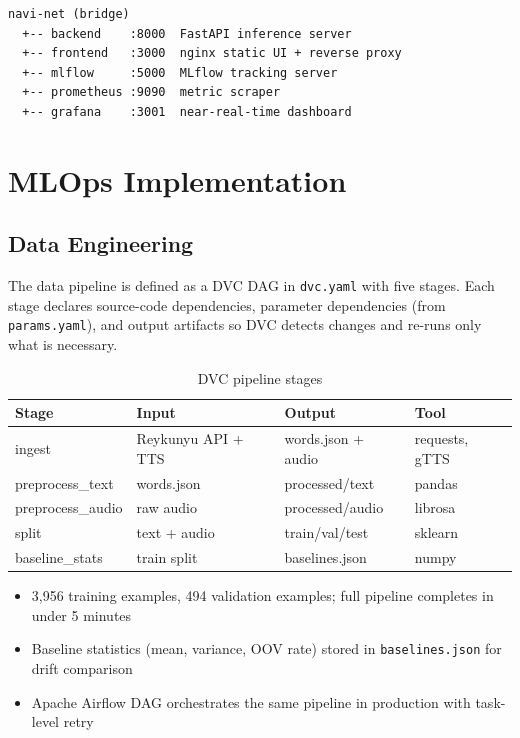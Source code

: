 \documentclass[12pt,a4paper]{article}
\begin{document}
\begin{lstlisting}
navi-net (bridge)
  +-- backend    :8000  FastAPI inference server
  +-- frontend   :3000  nginx static UI + reverse proxy
  +-- mlflow     :5000  MLflow tracking server
  +-- prometheus :9090  metric scraper
  +-- grafana    :3001  near-real-time dashboard
\end{lstlisting}

\section{MLOps Implementation}

\subsection{Data Engineering}

The data pipeline is defined as a DVC DAG in \texttt{dvc.yaml} with five stages.
Each stage declares source-code dependencies, parameter dependencies (from
\texttt{params.yaml}), and output artifacts so DVC detects changes and re-runs
only what is necessary.

\begin{table}[H]
  \centering
  \caption{DVC pipeline stages}
  \begin{tabular}{@{}L{3cm}L{4.5cm}L{4cm}L{2.5cm}@{}}
    \toprule
    \textbf{Stage} & \textbf{Input} & \textbf{Output} & \textbf{Tool} \\
    \midrule
    ingest           & Reykunyu API + TTS     & words.json + audio  & requests, gTTS \\
    preprocess\_text & words.json             & processed/text      & pandas         \\
    preprocess\_audio& raw audio              & processed/audio     & librosa        \\
    split            & text + audio           & train/val/test      & sklearn        \\
    baseline\_stats  & train split            & baselines.json      & numpy          \\
    \bottomrule
  \end{tabular}
\end{table}

\begin{itemize}[leftmargin=1.5em]
  \item 3,956 training examples, 494 validation examples; full pipeline completes in under 5 minutes
  \item Baseline statistics (mean, variance, OOV rate) stored in \texttt{baselines.json} for drift comparison
  \item Apache Airflow DAG orchestrates the same pipeline in production with task-level retry
\end{itemize}
\end{document}
